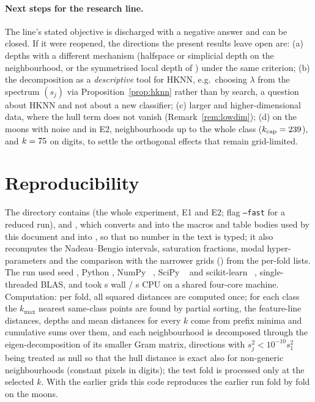 \documentclass[10pt,a4paper]{article}
\theoremstyle{plain}
\theoremstyle{definition}
\theoremstyle{remark}
\begin{document}
\paragraph{Next steps for the research line.} The line's stated objective is discharged with a negative answer and can be closed. If it were reopened, the directions the present results leave open are: (a) depths with a different mechanism (halfspace or simplicial depth on the neighbourhood, or the symmetrised local depth of \citealp{paindaveinevanbever2013}) under the same criterion; (b) the decomposition as a \emph{descriptive} tool for HKNN, e.g.\ choosing $\lambda$ from the spectrum $(s_j)$ via Proposition~\ref{prop:hknn} rather than by search, a question about HKNN and not about a new classifier; (c) larger and higher-dimensional data, where the hull term does not vanish (Remark~\ref{rem:lowdim}); (d) on the moons with noise and in E2, neighbourhoods up to the whole class ($k_{\rm cap}=239$), and $k=75$ on digits, to settle the orthogonal effects that remain grid-limited.

\appendix
\section{Reproducibility}\label{app:repro}
{\sloppy The directory contains  (the whole experiment, E1 and E2; flag \texttt{--fast} for a reduced run),  and , which converts  and  into the macros and table bodies used by this document and into , so that no number in the text is typed; it also recomputes the Nadeau--Bengio intervals, saturation fractions, modal hyper-parameters and the comparison with the narrower grids () from the per-fold lists. The run used seed \MetaSeed, Python \MetaPython, NumPy \MetaNumpy~\citep{harris2020}, SciPy \MetaScipy~\citep{virtanen2020} and scikit-learn \MetaSklearn~\citep{pedregosa2011}, single-threaded BLAS, and took \MetaSecondsWall{} s wall / \MetaSecondsCpu{} s CPU on a shared four-core machine. Computation: per fold, all squared distances are computed once; for each class the $k_{\max}$ nearest same-class points are found by partial sorting, the feature-line distances, depths and mean distances for every $k$ come from prefix minima and cumulative sums over them, and each neighbourhood is decomposed through the eigen-decomposition of its smaller Gram matrix, directions with $s_j^2<10^{-10}s_1^2$ being treated as null so that the hull distance is exact also for non-generic neighbourhoods (constant pixels in digits); the test fold is processed only at the selected $k$. With the earlier grids this code reproduces the earlier run fold by fold on the moons.\par}
\end{document}
